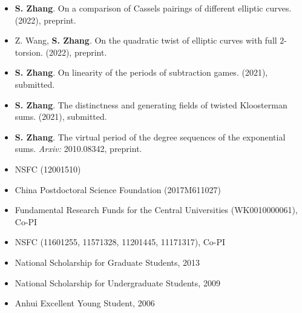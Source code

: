 \documentclass[11pt,a4paper]{article}
\begin{document}
\begin{itemize}
\item \textbf{S. Zhang}.
On a comparison of Cassels pairings of different elliptic curves.
(2022), preprint.

\item Z. Wang, \textbf{S. Zhang}.
On the quadratic twist of elliptic curves with full $2$-torsion.
(2022), preprint.

\item \textbf{S. Zhang}.
On linearity of the periods of subtraction games.
(2021), submitted.

\item \textbf{S. Zhang}.
The distinctness and generating fields of twisted Kloosterman sums.
(2021), submitted.

\item \textbf{S. Zhang}.
The virtual period of the degree sequences of the exponential sums.
{\em Arxiv:} 2010.08342, preprint.
\end{itemize}


\begin{itemize}
\item NSFC (12001510)
\item China Postdoctoral Science Foundation (2017M611027)
\item Fundamental Research Funds for the Central Universities (WK0010000061), Co-PI
\item NSFC (11601255, 11571328, 11201445, 11171317), Co-PI
\end{itemize}


\begin{itemize}
\item National Scholarship for Graduate Students, 2013
\item National Scholarship for Undergraduate Students, 2009
\item Anhui Excellent Young Student, 2006
\end{itemize}





\end{document}
